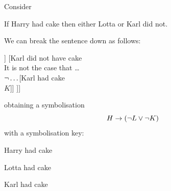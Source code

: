 Consider 
\begin{samplesent}
	\item If Harry had cake then either Lotta or Karl did not. 
\end{samplesent}
We can break the sentence down as follows:
\begin{center}
	\begin{forest}
		[If Harry had cake then either Lotta or Karl did not\\If \ldots then \ldots\\$\ldots\eif\ldots$
		[Harry had cake\\$H$]
		[Either Lotta or Karl did not have cake\\\ldots or \ldots\\$\almostinvisibleopenbracket\ldots\eor\ldots\almostinvisibleclosebracket$
		[Lotta did not have cake\\It is not the case that \ldots\\$\enot\ldots$[Lotta had cake\\$L$]]
		[Karl did not have cake\\It is not the case that \ldots\\$\enot\ldots$[Karl had cake\\$K$]]
		]]
	\end{forest}
\end{center}
obtaining a symbolisation $$H\rightarrow(\neg L\vee\neg K)$$
with a symbolisation key:\begin{ekey}
	\item[H] Harry had cake
	\item[L] Lotta had cake
	\item[K] Karl had cake
\end{ekey}



